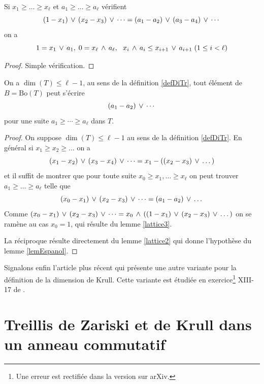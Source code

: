 \begin{lemma}\label{lattice2}
Si $x_1\geq \dots\geq x_{\ell}$ et $a_1\geq \dots\geq a_{\ell}$
vérifient
$$(1-x_1)\,\vee\, (x_2-x_3)\,\vee\,\cdots = (a_1-a_2)\,\vee\, (a_3-a_4)\,\vee\,\cdots$$
on a
$$1 = x_1\,\vee\, a_1,\;0 = x_{\ell}\,\wedge\, a_{\ell},~~x_i\,\wedge\, a_i\leq x_{i+1}\,\vee\,
a_{i+1} \; (1\leq i<\ell)$$
\end{lemma}

\begin{proof}
Simple vérification.
\end{proof}



\begin{theorem}
On a $\dim(T)\leq \ell-1$, au sens de la définition \ref{defDiTr},
\ssi tout élément de $B=\mathrm{Bo}(T)$ peut s'écrire
$$(a_1-a_2)\,\vee\, \cdots$$
pour une suite $a_1\geq \cdots\geq a_{\ell}$ dans $T$.
\end{theorem}

\begin{proof}
On suppose $\dim(T)\leq \ell-1$ au sens de la définition \ref{defDiTr}.
En général si $x_1\geq x_2\geq\dots$ on a
$$ (x_1-x_2)\,\vee\, (x_3-x_4)\,\vee\,\dots = x_1 - ((x_2-x_3)\,\vee\, \dots)$$
et il suffit de montrer que pour toute suite $x_0\geq x_1,\dots\geq
x_{\ell}$
on peut trouver $a_1\geq \dots\geq a_{\ell}$ telle que
$$ (x_0-x_1)\,\vee\, (x_2-x_3)\,\vee\,\dots = (a_1-a_2)\,\vee\,\dots$$
Comme $(x_0-x_1)\,\vee\, (x_2-x_3)\,\vee\,\dots = x_0\,\wedge\, ((1-x_1)\,\vee\, (x_2-
x_3)\,\vee\,\dots)$
on se ramène au cas $x_0=1$, qui résulte du lemme \ref{lattice3}.

 La réciproque résulte directement du lemme \ref{lattice2} qui donne l'hypothèse du lemme \ref{lemEspanol}.
\end{proof}

Signalons enfin l'article plus récent \cite[Español]{Espa08} qui présente une autre variante pour la définition \cov de la dimension de Krull. Cette variante
est étudiée en exercice\footnote{Une erreur est rectifiée dans la version sur arXiv.} XIII-17 de \cite{ACMC}. 


\section{Treillis de Zariski et de Krull dans un anneau commutatif}
\label{secZariKrull}
